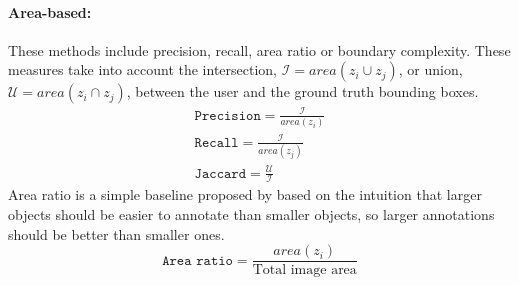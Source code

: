 \documentclass[12pt]{article}
\begin{document}
\paragraph{Area-based: } These methods include precision, recall, area ratio or boundary complexity. These measures take into account the intersection, $\mathcal{I}=area(z_i\cup z_j)$, or union, $\mathcal{U}=area(z_i\cap z_j)$, between the user and the ground truth bounding boxes.
\begin{align}
\texttt{Precision} = \frac{\mathcal{I}}{area(z_i)} \\
\texttt{Recall} = \frac{\mathcal{I}}{area(z_j)} \\
\texttt{Jaccard} = \frac{\mathcal{U}}{\mathcal{I}}
\end{align}
Area ratio is a simple baseline proposed by  \cite{Vittayakorn2011} based on the intuition that larger objects should be easier to annotate than smaller objects, so larger annotations should be better than smaller ones.
\begin{equation}
\texttt{Area ratio}=\frac{area(z_i)}{\text{Total image area}}
\end{equation}
\end{document}
